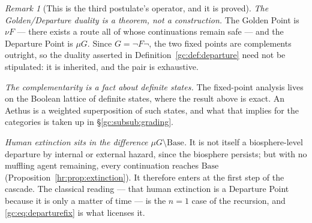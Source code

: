 \documentclass[11pt]{article}
\numberwithin{equation}{section}
\theoremstyle{plain}
\theoremstyle{definition}
\theoremstyle{remark}
\newtheorem{remark}[theorem]{Remark}
\begin{document}
\begin{remark}[This is the third postulate's operator, and it is proved]
\emph{The Golden/Departure duality is a theorem, not a construction.}
The Golden Point is $\nu F$ --- there exists a route all of whose
continuations remain safe --- and the Departure Point is $\mu G$. Since
$G=\neg F\neg$, the two fixed points are complements outright, so the
duality asserted in Definition~\ref{gc:def:departure} need not be
stipulated: it is inherited, and the pair is exhaustive.

\emph{The complementarity is a fact about definite states.} The
fixed-point analysis lives on the Boolean lattice of definite states,
where the result above is exact. An Aethus is a weighted superposition
of such states, and what that implies for the categories is taken up in
\S\ref{gc:subsub:grading}.

\emph{Human extinction sits in the difference
$\mu G\setminus\mathrm{Base}$.} It is not itself a biosphere-level
departure by internal or external hazard,
since the biosphere persists; but with no muffling agent remaining,
every continuation reaches $\mathrm{Base}$
(Proposition~\ref{hr:prop:extinction}). It therefore enters at the
first step of the cascade. The classical reading --- that human
extinction is a Departure Point because it is only a matter of time ---
is the $n=1$ case of the recursion, and \eqref{gc:eq:departurefix} is
what licenses it.
\end{remark}
\end{document}

